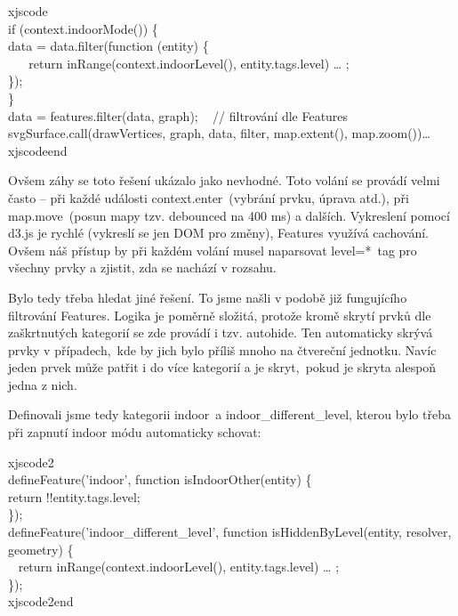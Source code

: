 xjscode\\
if (context.indoorMode()) \{\\
\hspace*{0.333em} data = data.filter(function (entity) \{\\
\hspace*{0.333em} ~ ~ return inRange(context.indoorLevel(), entity.tags.level) \textbar{}\textbar{} \ldots{} ;\\
\hspace*{0.333em} \});\\
\}\\
data = features.filter(data, graph); ~ // filtrování dle Features\\
svgSurface.call(drawVertices, graph, data, filter, map.extent(), map.zoom())\ldots{}\\
xjscodeend

Ovšem záhy se toto řešení ukázalo jako nevhodné. Toto volání se provádí velmi často -- při každé události context.enter~(vybrání prvku, úprava atd.), při map.move~(posun mapy tzv. debounced na 400 ms) a dalších. Vykreslení pomocí d3.js je rychlé (vykreslí se jen DOM pro změny), Features využívá cachování. Ovšem náš přístup by při každém volání musel naparsovat level=*~tag pro všechny prvky a zjistit, zda se nachází v rozsahu.

Bylo tedy třeba hledat jiné řešení. To jsme našli v podobě již fungujícího filtrování Features. Logika je poměrně složitá, protože kromě skrytí prvků dle zaškrtnutých kategorií se zde provádí i tzv. autohide. Ten automaticky skrývá prvky v případech,~kde by jich bylo příliš mnoho na čtvereční jednotku. Navíc jeden prvek může patřit i do více kategorií a je skryt,~pokud je skryta alespoň jedna z nich.

Definovali jsme tedy kategorii indoor~a indoor\_different\_level, kterou bylo třeba při zapnutí indoor módu automaticky schovat:

xjscode2\\
defineFeature('indoor', function isIndoorOther(entity) \{\\
\hspace*{0.333em} return !!entity.tags.level;\\
\});\\
defineFeature('indoor\_different\_level', function isHiddenByLevel(entity, resolver, geometry) \{\\
\hspace*{0.333em} ~ return inRange(context.indoorLevel(), entity.tags.level) \textbar{}\textbar{} \ldots{} ;\\
\});\\
xjscode2end

